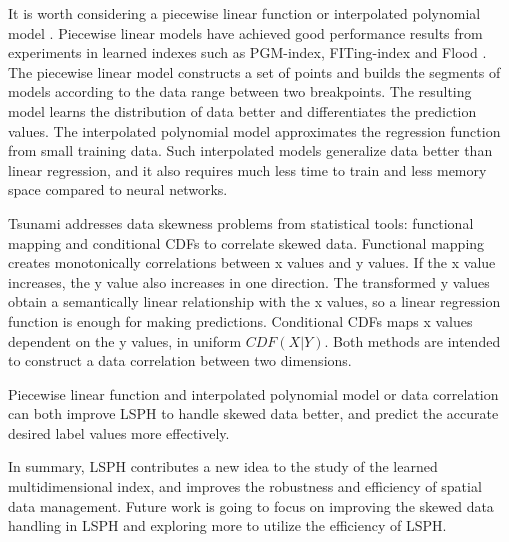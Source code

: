 It is worth considering a piecewise linear function or interpolated polynomial model \cite{setiawan2020function}. Piecewise linear models have achieved good performance results from experiments in learned indexes such as PGM-index, FITing-index and Flood \cite{Ferragina:ud, galakatos2019fiting, Nathan:2019wc}. The piecewise linear model constructs a set of points and builds the segments of models according to the data range between two breakpoints. The resulting model learns the distribution of data better and differentiates the prediction values.  The interpolated polynomial model approximates the regression function from small training data. Such interpolated models generalize data better than linear regression, and it also requires much less time to train and less memory space compared to neural networks. 

Tsunami \cite{Ding:2020we} addresses data skewness problems from statistical tools: functional mapping and conditional CDFs to correlate skewed data. Functional mapping creates monotonically correlations between x values and y values. If the x value increases, the y value also increases in one direction. The transformed y values obtain a semantically linear relationship with the x values, so a linear regression function is enough for making predictions. Conditional CDFs maps x values dependent on the y values, in uniform $CDF(X|Y)$. Both methods are intended to construct a data correlation between two dimensions. 

Piecewise linear function and interpolated polynomial model or data correlation can both improve LSPH to handle skewed data better, and predict the accurate desired label values more effectively.  

In summary, LSPH contributes a new idea to the study of the learned multidimensional index, and improves the robustness and efficiency of spatial data management. Future work is going to focus on improving the skewed data handling in LSPH and exploring more to utilize the efficiency of LSPH.

